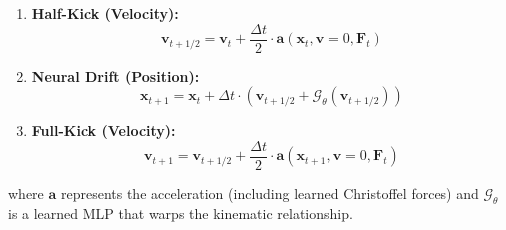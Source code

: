 \documentclass[12pt,a4paper]{article}
\begin{document}
\begin{enumerate}[label=\textbf{\arabic*.}, leftmargin=1.5cm]
\item \textbf{Half-Kick (Velocity):} 
    \begin{equation}
    \mathbf{v}_{t+1/2} = \mathbf{v}_t + \frac{\Delta t}{2} \cdot \mathbf{a}(\mathbf{x}_t, \mathbf{v}=0, \mathbf{F}_t)
    \end{equation}
    
\item \textbf{Neural Drift (Position):}
    \begin{equation}
    \mathbf{x}_{t+1} = \mathbf{x}_t + \Delta t \cdot \left( \mathbf{v}_{t+1/2} + \mathcal{G}_\theta(\mathbf{v}_{t+1/2}) \right)
    \end{equation}
    
\item \textbf{Full-Kick (Velocity):}
    \begin{equation}
    \mathbf{v}_{t+1} = \mathbf{v}_{t+1/2} + \frac{\Delta t}{2} \cdot \mathbf{a}(\mathbf{x}_{t+1}, \mathbf{v}=0, \mathbf{F}_t)
    \end{equation}
\end{enumerate}

where $\mathbf{a}$ represents the acceleration (including learned Christoffel forces) and $\mathcal{G}_\theta$ is a learned MLP that warps the kinematic relationship.
\end{document}
